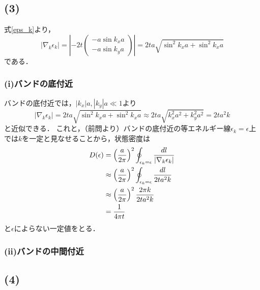 \documentclass[a4paper,11pt]{jsarticle}
\begin{document}
\subsection*{(3)}
式\eqref{eps_k}より，
\begin{equation}
  \left| \nabla_{k} \epsilon_k \right|
  = \left|-2t\left(
  \begin{array}{c}
    -a\sin{k_x a} \\
    -a\sin{k_y a}
  \end{array}
  \right)\right| 
  = 2ta \sqrt{\sin^2{k_x a}+\sin^2{k_x a}}
\end{equation}
である．

\subsubsection*{(i)バンドの底付近}
バンドの底付近では，$|k_x|a, |k_y|a \ll 1$より
\begin{equation}
  \left| \nabla_{k} \epsilon_k \right|  = 2ta \sqrt{\sin^2{k_x a}+\sin^2{k_x a}}\approx 2ta \sqrt{k_x^2a^2 + k_y^2a^2} = 2ta^2k
\end{equation}
と近似できる．
これと，（前問より）バンドの底付近の等エネルギー線$\epsilon_k=\epsilon$上では$k$を一定と見なせることから，状態密度は
\begin{align}
  D(\epsilon) &= \left(\frac{a}{2\pi}\right)^2 \oint_{\epsilon_k = \epsilon} \frac{dl}{\left| \nabla_{k} \epsilon_k \right|} \notag\\
  &\approx \left(\frac{a}{2\pi}\right)^2 \oint_{\epsilon_k = \epsilon} \frac{dl}{2ta^2k} \notag\\
  &\approx  \left(\frac{a}{2\pi}\right)^2 \frac{2\pi k}{2ta^2k} \notag\\
  &= \frac{1}{4\pi t}
\end{align}
と$\epsilon$によらない一定値をとる．

\subsubsection*{(ii)バンドの中間付近}


\subsection*{(4)}
\end{document}
